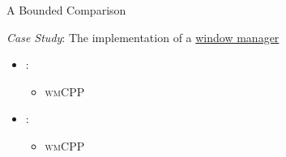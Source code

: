 \begin{secframe}{A Bounded Comparison}

    \textit{Case Study}: The implementation of a \underline{window manager}

    \begin{itemize}
        \item {}:
            \begin{itemize}
                \item \textsc{wmCPP}
            \end{itemize}

        \item {}:
            \begin{itemize}
                \item \textsc{wmCPP}
            \end{itemize}
    \end{itemize}

    \vfill

\end{secframe}
